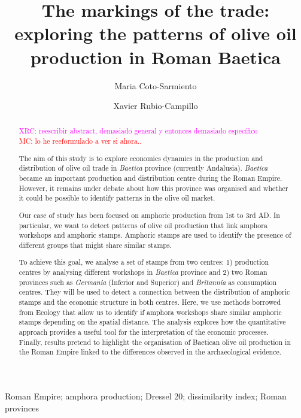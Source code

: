 \documentclass[review]{elsarticle}
\newcommand{\memo}[2]{\textcolor{#1}{#2}}
\newcommand{\maria}[1]{\memo{red}{MC: #1\\}}
\newcommand{\xavi}[1]{\memo{magenta}{XRC: #1\\}}
\begin{document}
\begin{frontmatter}

\title{The markings of the trade: exploring the patterns of olive oil production in Roman Baetica}

\author[ceipacadress]{Maria Coto-Sarmiento}


\author[edadress]{Xavier Rubio-Campillo}

\address[ceipacadress]{CEIPAC, Department of Prehistory and Archaeology, Montalegre, 6-8, 08001, University of Barcelona, Barcelona, Spain}
\address[edadress]{School of History, Classic \& Archaeology, Room OOM.33, William Robertson Wing, Old Medical School, Teviot Place, University of Edinburgh, UK}

\begin{keyword}
Roman Empire; amphora production; Dressel 20; dissimilarity index; Roman provinces
\end{keyword}


\begin{abstract}

\xavi{reescribir abstract, demasiado general y entonces demasiado específico}
\maria{lo he reeformulado a ver si ahora..}

The aim of this study is to explore economics dynamics in the production and distribution of olive oil trade in \textit{Baetica} province (currently Andalusia). \textit{Baetica} became an important production and distribution centre during the Roman Empire. However, it remains under debate about how this province was organised and whether it could be possible to identify patterns in the olive oil market. 

Our case of study has been focused on amphoric production from 1st to 3rd AD. In particular, we want to detect patterns of olive oil production that link amphora workshops and amphoric stamps. Amphoric stamps are used to identify the presence of different groups that might share similar stamps. 

To achieve this goal, we analyse a set of stamps from two centres: 1) production centres by analysing different workshops in \textit{Baetica} province and 2) two Roman provinces such as \textit{Germania} (Inferior and Superior) and \textit{Britannia} as consumption centres. They will be used to detect a connection between the distribution of amphoric stamps and the economic structure in both centres. Here, we use methods borrowed from Ecology that allow us to identify if amphora workshops share similar amphoric stamps depending on the spatial distance. The analysis explores how the quantitative approach provides a useful tool for the interpretation of the economic processes. Finally, results pretend to highlight the organisation of Baetican olive oil production in the Roman Empire linked to the differences observed in the archaeological evidence.



\end{abstract}
\end{frontmatter}
\end{document}
